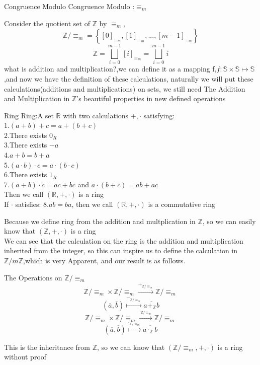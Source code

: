 \documentclass[13pt, a4paper, oneside]{book}
\begin{document}
	\begin{definition}{Congruence Modulo}{}
		Congruence Modulo	:$\equiv_{m}$
	\end{definition}
	Consider the quotient set of $\mathbb{Z}$ by $\equiv_{m}$,$$ \mathbb{Z}/ \equiv_{m} = \left\{ \left[0\right]_{\equiv_{m}}, \left[1\right]_{\equiv_{m}}, ... ,\left[m-1\right]_{\equiv_{m}} \right\} $$
	$$\mathbb{Z} = \bigsqcup^{m-1}_{i = 0} \left[i\right]_{\equiv_{m}} = \bigsqcup^{m-1}_{i = 0} \overline{i} $$
	what is addition and multiplication?,we can define it as a mapping f,$f: \mathbb{S} \times \mathbb{S} \mapsto \mathbb{S}$,and now we have the definition of these calculations, naturally we will put these calculations(additions and multiplications) on sets, we still need The Addition and Multiplication in $\mathbb{Z} $'s beautiful properties in new defined operations
	\begin{definition}{Ring}{}
		Ring:A set $\mathbb{R}$ with two calculations $+,\cdot$ satisfying: \\
		1.$(a+b)+c = a+(b+c)$ \\
		2.There exists $0_R$ \\
		3.There exists $-a$ \\
		4.$a+b = b+a$ \\
		5.$(a \cdot b) \cdot c = a \cdot (b \cdot c)$ \\
		6.There exists $1_R$ \\
		7.$(a+b) \cdot c = ac + bc$ and $ a \cdot (b+c) = ab+ac $ \\
		Then we call $(\mathbb{R},+,\cdot)$ is a ring \\
		If $\cdot$ satisfies: 8.$ab=ba$, then we call $(\mathbb{R},+,\cdot)$ is a commutative ring
	\end{definition}
	Because we define ring from the addition and multplication in $ \mathbb{Z} $, so we can easily know that $(\mathbb{Z}, +, \cdot)$ is a ring \\
	We can see that the calculation on the ring is the addition and multiplication inherited from the integer, so this can inspire us to define the calculation in $\mathbb{Z}/ m\mathbb{Z}$,which is very Apparent, and our result is as follows. \\
	
	\begin{definition}{The Operations on $\mathbb{Z}/ \equiv_{m} $}{}
		$$ \mathbb{Z}/ \equiv_{m} \times \mathbb{Z}/ \equiv_{m} \overset{+_{\mathbb{Z}/ \equiv_{m}}}{\longrightarrow} \mathbb{Z}/ \equiv_{m} $$
		$$ (\overline{a}, \overline{b}) \overset{+_{\mathbb{Z}/ \equiv_{m}}}{\mapsto} \overline{a +_{\mathbb{Z}} b} $$
		$$ \mathbb{Z}/ \equiv_{m} \times \mathbb{Z}/ \equiv_{m} \overset{\cdot_{\mathbb{Z}/ \equiv_{m}}}{\longrightarrow} \mathbb{Z}/ \equiv_{m} $$
		$$ (\overline{a}, \overline{b}) \overset{\cdot_{\mathbb{Z}/ \equiv_{m}}}{\mapsto} \overline{a \cdot_{\mathbb{Z}} b} $$
	\end{definition}
	This is the inheritance from $\mathbb{Z}$, so we can know that $(\mathbb{Z}/ \equiv_{m},+,\cdot)$ is a ring without proof 
	
\end{document}
